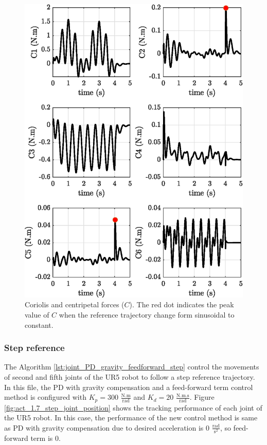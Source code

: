 \begin{figure}[H]
	\centering
	\includegraphics{images/act_1.7_sin/C.eps}
	\caption{Coriolis and centripetal forces ($C$). The red dot indicates the peak value of $C$ when the reference trajectory change form sinusoidal to constant.}
	\label{fig:act_1.7_sin_C}
\end{figure} 

\newpage
\subsubsection{Step reference}
The Algorithm \ref{lst:joint_PD_gravity_feedforward_step} control the movements of second and fifth joints of the UR5 robot to follow a step reference trajectory. In this file, the PD with gravity compensation and a feed-forward term control method is configured with $K_p=300$ $\mathrm{\frac{N.m}{rad}}$ and $K_d=20$ $\mathrm{\frac{N.m.s}{rad}}$. Figure \ref{fig:act_1.7_step_joint_position} shows the tracking performance of each joint of the UR5 robot. In this case, the performance of the new control method is same as PD with gravity compensation due to desired acceleration is $0$ $\mathrm{\frac{rad}{s^2}}$, so feed-forward term is $0$. \vspace{5px}

